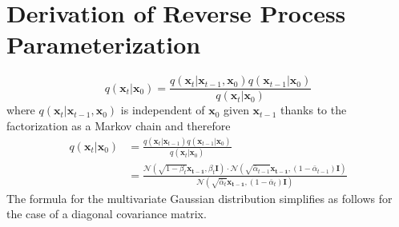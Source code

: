 \section{Derivation of Reverse Process Parameterization}
\begin{equation}
    q(\bm{x}_t|\bm{x}_{0}) = \frac{q(\bm{x}_t|\bm{x}_{t-1},\bm{x}_{0})q(\bm{x}_{t-1}|\bm{x}_{0})}{q(\bm{x}_t|\bm{x}_{0})}
\end{equation}
where $q(\bm{x}_t|\bm{x}_{t-1},\bm{x}_{0})$ is independent of $\bm{x}_0$ given $\bm{x}_{t-1}$ thanks to the factorization as a Markov chain and therefore
\begin{align}
    q(\bm{x}_t|\bm{x}_{0}) & = \frac{q(\bm{x}_t|\bm{x}_{t-1})q(\bm{x}_{t-1}|\bm{x}_{0})}{q(\bm{x}_t|\bm{x}_{0})}                                                                                                                                                       \\
                           & = \frac{\mathcal{N}(\sqrt{1-\beta_t}\bm{x_{t-1}}, \beta_t \bm{I}) \cdot \mathcal{N}(\sqrt{\bar{\alpha}_{t-1}}\bm{x_{t-1}}, (1-\bar{\alpha}_{t-1}) \bm{I})}{\mathcal{N}(\sqrt{\bar{\alpha}_{t}}\bm{x_{t-1}}, (1-\bar{\alpha}_{t}) \bm{I})}
\end{align}
The formula for the multivariate Gaussian distribution simplifies as follows for the case of a diagonal covariance matrix.
\begin{align}
\end{align}
